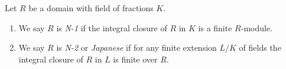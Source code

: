 \begin{definition}
\label{definition-N}
\begin{reference}
\cite[Chapter 0, Definition 23.1.1]{EGA}
\end{reference}
Let $R$ be a domain with field of fractions $K$.
\begin{enumerate}
\item We say $R$ is {\it N-1} if the integral closure of $R$ in $K$
is a finite $R$-module.
\item We say $R$ is {\it N-2} or {\it Japanese} if for any finite
extension $L/K$ of fields the integral closure of $R$ in $L$
is finite over $R$.
\end{enumerate}
\end{definition}